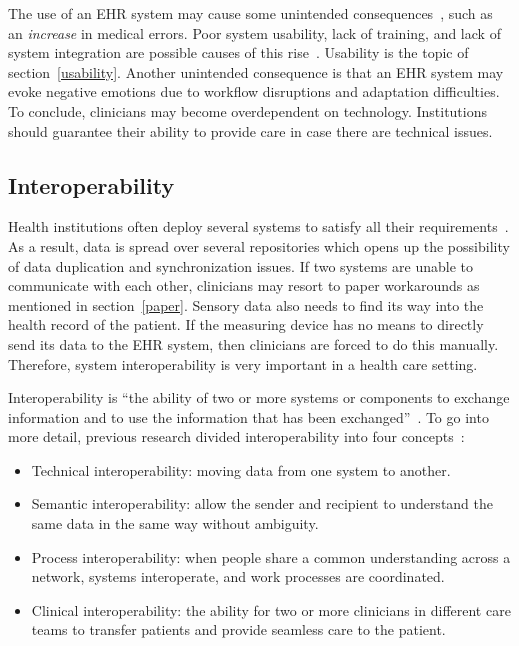         The use of an EHR system may cause some unintended consequences~\cite{Campbell2006}, such as an \emph{increase} in medical errors. Poor system usability, lack of training, and lack of system integration are possible causes of this rise~\cite{Koppel2005}. Usability is the topic of section~\ref{usability}. Another unintended consequence is that an EHR system may evoke negative emotions due to workflow disruptions and adaptation difficulties. To conclude, clinicians may become overdependent on technology. Institutions should guarantee their ability to provide care in case there are technical issues.

    \subsection{Interoperability}\label{interoperability}

    Health institutions often deploy several systems to satisfy all their requirements~\cite{Payne2012}. As a result, data is spread over several repositories which opens up the possibility of data duplication and synchronization issues. If two systems are unable to communicate with each other, clinicians may resort to paper workarounds as mentioned in section~\ref{paper}. Sensory data also needs to find its way into the health record of the patient. If the measuring device has no means to directly send its data to the EHR system, then clinicians are forced to do this manually. Therefore, system interoperability is very important in a health care setting.

    Interoperability is ``the ability of two or more systems or components to exchange information and to use the information that has been exchanged''~\cite{IEEE1990}. To go into more detail, previous research divided interoperability into four concepts~\cite{Benson2016}:
    \begin{itemize}
        \item Technical interoperability: moving data from one system to another.
        \item Semantic interoperability: allow the sender and recipient to understand the same data in the same way without ambiguity.
        \item Process interoperability: when people share a common understanding across a network, systems interoperate, and work processes are coordinated.
        \item Clinical interoperability: the ability for two or more clinicians in different care teams to transfer patients and provide seamless care to the patient.
    \end{itemize}

